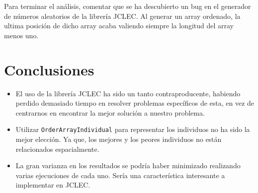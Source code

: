 \documentclass[a4paper,12pt,titlepage]{article}
\begin{document}
Para terminar el análisis, comentar que se ha descubierto un bug en el generador de números aleatorios de la librería JCLEC. Al generar un array ordenado, la ultima posición de dicho array acaba valiendo siempre la longitud del array menos uno.
	 
\section{Conclusiones}

\begin{itemize}[noitemsep]
	\item El uso de la librería JCLEC ha sido un tanto contraproducente, habiendo perdido demasiado tiempo en resolver problemas específicos de esta, en vez de centrarnos en encontrar la mejor solución a nuestro problema.
	\item Utilizar \lstinline|OrderArrayIndividual| para representar los individuos no ha sido la mejor elección. Ya que, los mejores y los peores individuos no están relacionados espacialmente.
	\item La gran varianza en los resultados se podría haber minimizado realizando varias ejecuciones de cada uno. Sería una característica interesante a implementar en JCLEC.
\end{itemize}

\newpage


\end{document}
